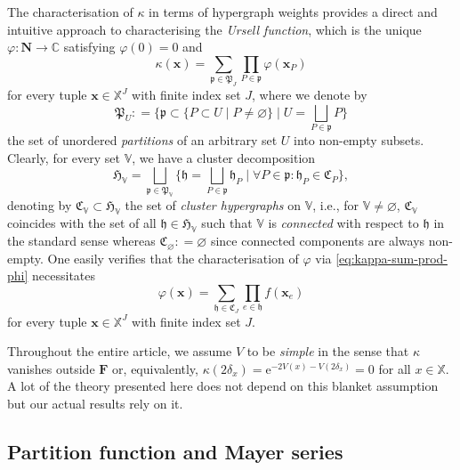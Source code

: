 \documentclass[10pt,a4paper]{amsart}
\newcommand{\e}{\mathrm{e}}
\newcommand{\C}{\mathbb{C}}
\newcommand{\X}{\mathbb X}
\newcommand{\V}{\mathbb V}
\newcommand{\be}{\begin{equation}}
\newcommand{\ee}{\end{equation}}
\begin{document}
The characterisation of $\kappa$ in terms of hypergraph weights provides a direct and intuitive approach to characterising the \emph{Ursell function}, which is the unique $\varphi : \mathbf N \to \C$ satisfying $\varphi(0) = 0$ and
\be \label{eq:kappa-sum-prod-phi}
	\kappa(\mathbf x) = \sum_{\mathfrak p \in \mathfrak P_J} \prod_{P \in \mathfrak p} \varphi(\mathbf x_P)
\ee
for every tuple $\mathbf x \in \X^J$ with finite index set $J$, where we denote by
\[
	\mathfrak P_U : = \{\mathfrak p \subset \{P \subset U \mid P \neq \varnothing\} \mid U = \textstyle \bigsqcup_{P \in \mathfrak p} P\}
\]
the set of unordered \emph{partitions} of an arbitrary set $U$ into non-empty subsets. 
Clearly, for every set $\V$, we have a cluster decomposition
\[
	\mathfrak H_\V = \bigsqcup_{\mathfrak p \in \mathfrak P_\V} \{\mathfrak h = \textstyle \bigsqcup_{P \in \mathfrak p} \mathfrak h_P \mid \forall P \in \mathfrak p : \mathfrak h_P \in \mathfrak C_P\},
\]
denoting by $\mathfrak C_\V \subset \mathfrak H_\V$ the set of \emph{cluster hypergraphs} on $\V$, i.e., for $\V \neq \varnothing$, $\mathfrak C_\V$ coincides with the set of all $\mathfrak h \in \mathfrak H_\V$ such that $\V$ is \emph{connected} with respect to $\mathfrak h$ in the standard sense whereas $\mathfrak C_\varnothing : = \varnothing$ since connected components are always non-empty. 
One easily verifies that the characterisation of $\varphi$ via \eqref{eq:kappa-sum-prod-phi} necessitates
\[
	\varphi(\mathbf x) = \sum_{\mathfrak h \in \mathfrak C_J} \prod_{e \in \mathfrak h} f(\mathbf x_e)
\]
for every tuple $\mathbf x \in \X^J$ with finite index set $J$.

Throughout the entire article, we assume $V$ to be \emph{simple} in the sense that $\kappa$ vanishes outside $\mathbf F$ or, equivalently, $\kappa(2 \delta_x) = \e^{- 2 V(x) - V(2 \delta_x)} = 0$ for all $x \in \X$. 
A lot of the theory presented here does not depend on this blanket assumption but our actual results rely on it.

\subsection{Partition function and Mayer series}
\end{document}

